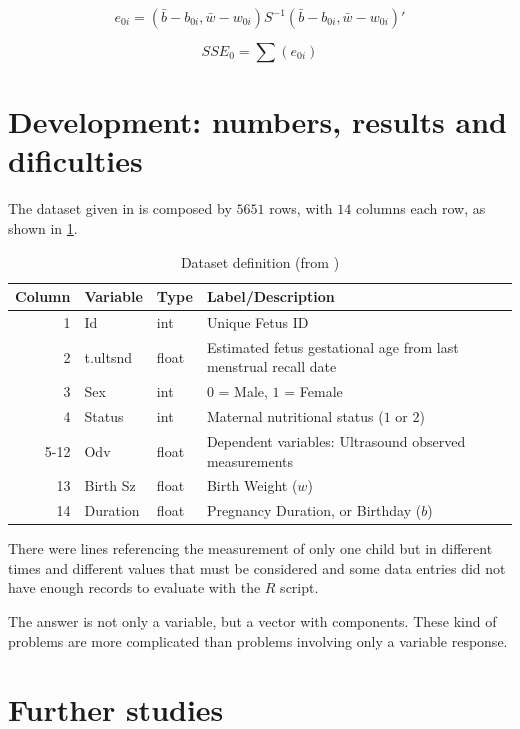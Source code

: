 \documentclass[10pt,twocolumn,letterpaper]{article}
\begin{document}
\begin{equation}
e_{0i} = (\bar{b} - b_{0i}, \bar{w} - w_{0i})S^{-1}(\bar{b} - b_{0i}, \bar{w} - w_{0i})' 
\label{eq:e0i}
\end{equation}

$$SSE_0 = \sum(e_{0i})$$

\section{Development: numbers, results and dificulties}

The dataset given in \cite{topcoder} is composed by $5651$ rows, with $14$ columns each row, as shown in \ref{table:definitions}.
\begin{table}
\label{table:definitions}
\begin{center}
\begin{tabular}{rlll}
Column  & Variable  & Type  &  Label/Description \\
\hline
   1    & Id        & int   &  Unique Fetus ID \\
   2    & t.ultsnd  & float &  Estimated fetus gestational age from last menstrual recall date \\
   3    & Sex       & int   &  $0$ = Male, $1$ = Female \\
   4    & Status    & int   &  Maternal nutritional status ($1$ or $2$) \\
 5-12   & Odv       & float &  Dependent variables: Ultrasound observed measurements \\
  13    & Birth Sz  & float &  Birth Weight ($w$) \\
  14    & Duration  & float &  Pregnancy Duration, or Birthday ($b$) \\
\end{tabular} 
\caption {Dataset definition (from \cite{topcoder})}	
\end{center}
\end{table}

There were lines referencing the measurement of only one child but in different times and different values that must be considered and some data entries did not have enough records to evaluate with the $R$ script.

The answer is not only a variable, but a vector with components. These kind of problems are more complicated than problems involving only a variable response.

\section{Further studies}
\end{document}
